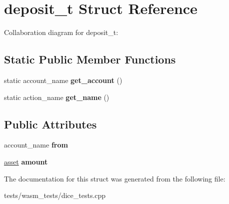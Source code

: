 \hypertarget{structdeposit__t}{}\section{deposit\+\_\+t Struct Reference}
\label{structdeposit__t}


Collaboration diagram for deposit\+\_\+t\+:
\subsection*{Static Public Member Functions}
\begin{DoxyCompactItemize}
\item 
\mbox{\label{structdeposit__t_a421e39f2e0be88229dd9a6685ad5b520}} 
static account\+\_\+name {\bfseries get\+\_\+account} ()
\item 
\mbox{\label{structdeposit__t_a11baa3df3b2a641aafe45795631dad2d}} 
static action\+\_\+name {\bfseries get\+\_\+name} ()
\end{DoxyCompactItemize}
\subsection*{Public Attributes}
\begin{DoxyCompactItemize}
\item 
\mbox{\label{structdeposit__t_aa7fb169014e277d3b551f3c495fe8d83}} 
account\+\_\+name {\bfseries from}
\item 
\mbox{\label{structdeposit__t_a57008943c02c9becd8a6a1cb12282d41}} 
\mbox{\hyperlink{structaacio_1_1asset}{asset}} {\bfseries amount}
\end{DoxyCompactItemize}


The documentation for this struct was generated from the following file\+:\begin{DoxyCompactItemize}
\item 
tests/wasm\+\_\+tests/dice\+\_\+tests.\+cpp\end{DoxyCompactItemize}
